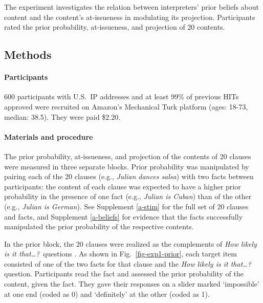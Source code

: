 \documentclass[11pt,fleqn]{article}
\newcommand{\6}{\mbox{$[\hspace*{-.6mm}[$}}
\newcommand{\9}{\mbox{$]\hspace*{-.6mm}]$}}
\newcommand{\citepos}[1]{\citeauthor{#1}'s \citeyear{#1}}
\begin{document}
The experiment investigates the relation between interpreters' prior beliefs about content and the content's at-issueness in modulating its projection. Participants rated the prior probability, at-issueness, and projection of 20 contents. %

\subsection{Methods} 
 
\paragraph{Participants} 600 participants with U.S.\ IP addresses and at least 99\% of previous HITs approved were recruited on Amazon's Mechanical Turk platform (ages: 18-73, median: 38.5). They were paid \$2.20.

\paragraph{Materials and procedure} The prior probability, at-issueness, and projection of the contents of 20 clauses were measured in three separate blocks. Prior probability was manipulated by pairing each of the 20 clauses (e.g., \emph{Julian dances salsa})  with two facts between participants: the content of each clause was expected to have a higher prior probability in the presence of one fact (e.g., \emph{Julian is Cuban}) than of the other (e.g., \emph{Julian is German}). See Supplement \ref{a-stim} for the full set of 20 clauses and facts, and Supplement \ref{a-beliefs} for evidence that the facts successfully manipulated the prior probability of the respective contents.

In the prior block, the 20 clauses were realized as the complements of {\em How likely is it that\ldots?}~questions \citep{degen-tonhauser-openmind}. As shown in Fig.~\ref{fig-exp1-prior}, each target item consisted of one of the two facts for that clause and the {\em How likely is it that\ldots?} question. Participants read the fact and assessed the prior probability of the content, given the fact. They gave their responses on a slider marked `impossible' at one end (coded as 0) and `definitely' at the other (coded as 1). 
\end{document}
